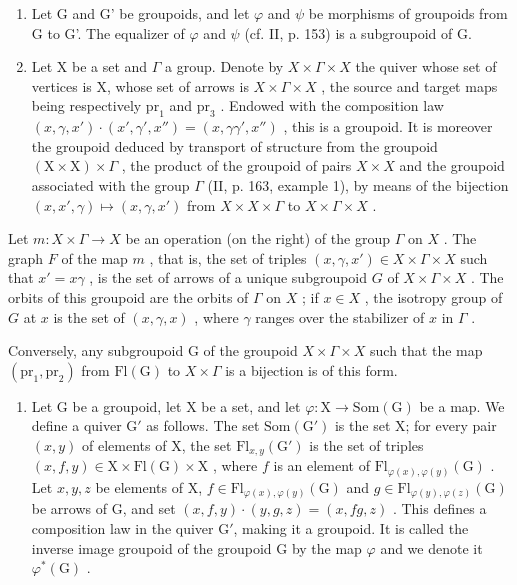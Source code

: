 \begin{enumerate}
\def\labelenumi{\arabic{enumi})}
\setcounter{enumi}{1}
\item
  Let G and G' be groupoids, and let \(\varphi\) and \(\psi\) be morphisms of groupoids from G to G'. The equalizer of \(\varphi\) and \(\psi\) (cf. II, p. 153) is a subgroupoid of G.
\item
  Let X be a set and \(\Gamma\) a group. Denote by \(X \times \Gamma \times X\) the quiver whose set of vertices is X, whose set of arrows is \(X \times \Gamma \times X\) , the source and target maps being respectively \(\mathrm{pr}_1\) and \(\mathrm{pr}_3\) . Endowed with the composition law \((x, \gamma, x') \cdot (x', \gamma', x'') = (x, \gamma \gamma', x'')\) , this is a groupoid. It is moreover the groupoid deduced by transport of structure from the groupoid \((\mathrm{X}\times\mathrm{X})\times\Gamma\) , the product of the groupoid of pairs \(X\times X\) and the groupoid associated with the group \(\Gamma\) (II, p. 163, example 1), by means of the bijection \((x,x',\gamma)\mapsto(x,\gamma,x')\) from \(X\times X\times\Gamma\) to \(X\times\Gamma\times X\) .
\end{enumerate}

Let \(m\colon X \times \Gamma \to X\) be an operation (on the right) of the group \(\Gamma\) on \(X\) . The graph \(F\) of the map \(m\) , that is, the set of triples \((x, \gamma, x') \in X \times \Gamma \times X\) such that \(x' = x\gamma\) , is the set of arrows of a unique subgroupoid \(G\) of \(X \times \Gamma \times X\) . The orbits of this groupoid are the orbits of \(\Gamma\) on \(X\) ; if \(x \in X\) , the isotropy group of \(G\) at \(x\) is the set of \((x, \gamma, x)\) , where \(\gamma\) ranges over the stabilizer of \(x\) in \(\Gamma\) .

Conversely, any subgroupoid G of the groupoid \(X \times \Gamma \times X\) such that the map \((\mathrm{pr}_{1}, \mathrm{pr}_{2})\) from \(\mathrm{Fl}(\mathrm{G})\) to \(X \times \Gamma\) is a bijection is of this form.

\begin{enumerate}
\def\labelenumi{\arabic{enumi})}
\setcounter{enumi}{3}
\tightlist
\item
  Let G be a groupoid, let X be a set, and let \(\varphi\colon\mathrm{X}\to\mathrm{Som}(\mathrm{G})\) be a map. We define a quiver \(\mathrm{G}'\) as follows. The set \(\mathrm{Som}(\mathrm{G}')\) is the set X; for every pair \((x,y)\) of elements of X, the set \(\mathrm{Fl}_{x,y}(\mathrm{G}')\) is the set of triples \((x,f,y)\in\mathrm{X}\times\mathrm{Fl}(\mathrm{G})\times\mathrm{X}\) , where \(f\) is an element of \(\mathrm{Fl}_{\varphi(x),\varphi(y)}(\mathrm{G})\) . Let \(x,y,z\) be elements of X, \(f\in\mathrm{Fl}_{\varphi(x),\varphi(y)}(\mathrm{G})\) and \(g\in\mathrm{Fl}_{\varphi(y),\varphi(z)}(\mathrm{G})\) be arrows of G, and set \((x,f,y)\cdot(y,g,z)=(x,fg,z)\) . This defines a composition law in the quiver \(\mathrm{G}'\), making it a groupoid. It is called the inverse image groupoid of the groupoid G by the map \(\varphi\) and we denote it \(\varphi^{*}(\mathrm{G})\) .
\end{enumerate}

